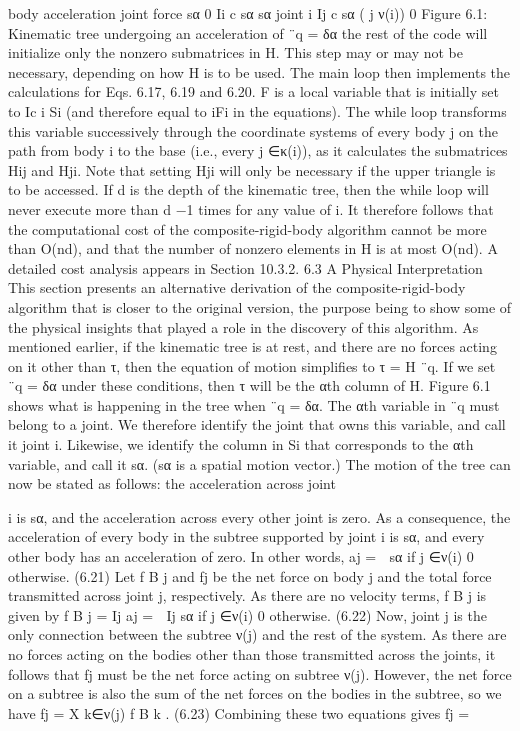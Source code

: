 body acceleration joint force sα 0 Ii c sα sα joint i Ij c sα ( j ν(i)) 0 Figure 6.1: Kinematic tree undergoing an acceleration of ¨q = δα the rest of the code will initialize only the nonzero submatrices in H. This step may or may not be necessary, depending on how H is to be used. The main loop then implements the calculations for Eqs. 6.17, 6.19 and 6.20. F is a local variable that is initially set to Ic i Si (and therefore equal to iFi in the equations). The while loop transforms this variable successively through the coordinate systems of every body j on the path from body i to the base (i.e., every j ∈κ(i)), as it calculates the submatrices Hij and Hji. Note that setting Hji will only be necessary if the upper triangle is to be accessed. If d is the depth of the kinematic tree, then the while loop will never execute more than d −1 times for any value of i. It therefore follows that the computational cost of the composite-rigid-body algorithm cannot be more than O(nd), and that the number of nonzero elements in H is at most O(nd). A detailed cost analysis appears in Section 10.3.2. 6.3 A Physical Interpretation This section presents an alternative derivation of the composite-rigid-body algorithm that is closer to the original version, the purpose being to show some of the physical insights that played a role in the discovery of this algorithm. As mentioned earlier, if the kinematic tree is at rest, and there are no forces acting on it other than τ, then the equation of motion simplifies to τ = H ¨q. If we set ¨q = δα under these conditions, then τ will be the αth column of H. Figure 6.1 shows what is happening in the tree when ¨q = δα. The αth variable in ¨q must belong to a joint. We therefore identify the joint that owns this variable, and call it joint i. Likewise, we identify the column in Si that corresponds to the αth variable, and call it sα. (sα is a spatial motion vector.) The motion of the tree can now be stated as follows: the acceleration across joint

i is sα, and the acceleration across every other joint is zero. As a consequence, the acceleration of every body in the subtree supported by joint i is sα, and every other body has an acceleration of zero. In other words, aj =  sα if j ∈ν(i) 0 otherwise. (6.21) Let f B j and fj be the net force on body j and the total force transmitted across joint j, respectively. As there are no velocity terms, f B j is given by f B j = Ij aj =  Ij sα if j ∈ν(i) 0 otherwise. (6.22) Now, joint j is the only connection between the subtree ν(j) and the rest of the system. As there are no forces acting on the bodies other than those transmitted across the joints, it follows that fj must be the net force acting on subtree ν(j). However, the net force on a subtree is also the sum of the net forces on the bodies in the subtree, so we have fj = X k∈ν(j) f B k . (6.23) Combining these two equations gives fj =

